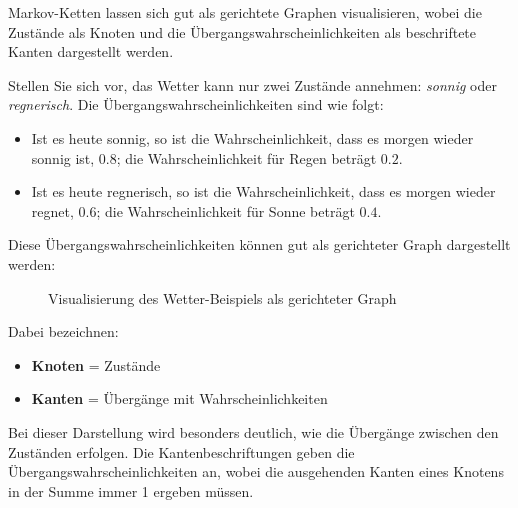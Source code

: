 Markov-Ketten lassen sich gut als gerichtete Graphen visualisieren, wobei die Zustände als Knoten und die Übergangswahrscheinlichkeiten als beschriftete Kanten dargestellt werden.

\begin{myexample}\label{example:graph}
Stellen Sie sich vor, das Wetter kann nur zwei Zustände annehmen: \emph{sonnig} oder \emph{regnerisch}. Die Übergangswahrscheinlichkeiten sind wie folgt:
\begin{itemize}
    \item Ist es heute sonnig, so ist die Wahrscheinlichkeit, dass es morgen wieder sonnig ist, $0.8$; die Wahrscheinlichkeit für Regen beträgt $0.2$.
    \item Ist es heute regnerisch, so ist die Wahrscheinlichkeit, dass es morgen wieder regnet, $0.6$; die Wahrscheinlichkeit für Sonne beträgt $0.4$.
\end{itemize}
Diese Übergangswahrscheinlichkeiten können gut als gerichteter Graph dargestellt werden:
\begin{figure}[H]
    \centering
    \caption{Visualisierung des Wetter-Beispiels als gerichteter Graph}
    \label{fig:markov-weather}
\end{figure}

Dabei bezeichnen:
\begin{itemize}
    \item[{\faCircle[regular]}] \textbf{Knoten} = Zustände
    \item[\faArrowRight] \textbf{Kanten} = Übergänge mit Wahrscheinlichkeiten
\end{itemize}
\end{myexample}

Bei dieser Darstellung wird besonders deutlich, wie die Übergänge zwischen den Zuständen erfolgen. Die Kantenbeschriftungen geben die Übergangswahrscheinlichkeiten an, wobei die ausgehenden Kanten eines Knotens in der Summe immer 1 ergeben müssen.

